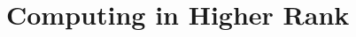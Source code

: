 \appendix

\newcommand{\G}{{\mathscr G}}
\newcommand{\V}{{\mathscr V}}
\newcommand{\bG}{\mathbf{G}}
\newcommand{\bH}{\mathbf{H}}
\newcommand{\bR}{\mathbf{R}}
\newcommand{\bC}{\mathbf{C}}
\newcommand{\bP}{\mathbf{P}}
\newcommand{\Proj}{{\mathbb P}}
\renewcommand{\P}{{\mathbb P}}
\newcommand{\PPP}{\mathscr P}
\newcommand{\MMM}{\mathscr M}
\newcommand{\WWW}{\mathscr W}
\newcommand{\sA}{\mathscr A}
\newcommand{\sC}{\mathscr C}
\newcommand{\sO}{\mathscr O}
\newcommand{\sV}{\mathscr V}
\renewcommand{\sS}{\mathscr S}
\newcommand{\fg}{\mathfrak g}
\newcommand{\aaa}{\mathbf{a}}
\renewcommand{\H}{\mathscr H}
\newcommand{\fh}{\mathfrak h}
\renewcommand{\emptyset}{\varnothing}
\newcommand{\cusp}{\text{cusp}}
\newcommand{\bv}{\mathbf{v}}
\newcommand{\bu}{\mathbf{u}}
\newcommand{\borser}[1]{#1^{\text{BS}}}
\newcommand{\closure}[1]{(#1)^{-}}
\renewcommand{\norm}[1]{\|#1\|}
\newcommand{\Vor}{Vorono\v{\i}\xspace}
\newcommand{\vv}{{\mathbf {v}}}
\renewcommand{\aa}{{\mathbf {a}}}
\newcommand{\bb}{{\mathbf {b}}}
\newcommand{\ww}{{\mathbf {w}}}
\newcommand{\xx}{{\mathbf {x}}}
\newcommand{\uu}{{\mathbf {u}}}
\newcommand{\yy}{{\mathbf {y}}}
\newcommand{\qq}{{\mathbf {q}}}
\newcommand{\sets}[1]{[\![#1]\!]}
\newcommand{\coinv}[1]{(S_{#1})_{\Gamma }}
\renewcommand{\riso}{\xrightarrow{\sim}}


\chapter{Computing in Higher Rank}\label{ch:appendix}

